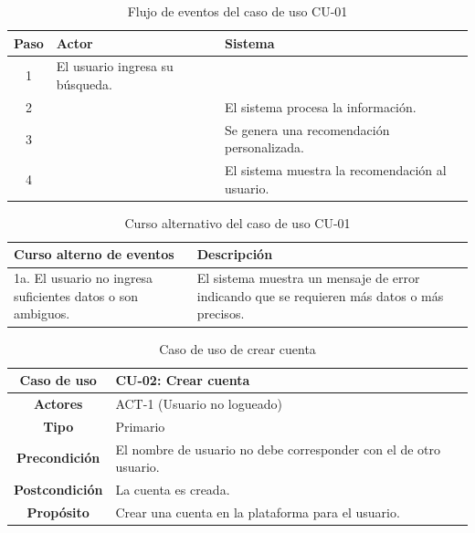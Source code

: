 \begin{table}[H]
\centering
\begin{tabular}{|c|p{5cm}|p{5cm}|}
\hline
\rowcolor{green!40} \textbf{Paso} & \textbf{Actor} & \textbf{Sistema} \\ \hline
\rowcolor{blue!10} 1 & El usuario ingresa su búsqueda. & \\ \hline
\rowcolor{blue!10} 2 & & El sistema procesa la información. \\ \hline
\rowcolor{blue!10} 3 & & Se genera una recomendación personalizada. \\ \hline
\rowcolor{blue!10} 4 & & El sistema muestra la recomendación al usuario. \\ \hline
\end{tabular}
\caption{Flujo de eventos del caso de uso CU-01}
\end{table}

\begin{table}[H]
\centering
\begin{tabular}{|p{4cm}|p{8cm}|}
\hline
\rowcolor{green!40} \textbf{Curso alterno de eventos} & \textbf{Descripción} \\ \hline
\rowcolor{blue!10} 1a. El usuario no ingresa suficientes datos o son ambiguos. & El sistema muestra un mensaje de error indicando que se requieren más datos o más precisos. \\ \hline
\end{tabular}
\caption{Curso alternativo del caso de uso CU-01}
\end{table}

\begin{table}[H]
\centering
\begin{tabular}{|c|p{10cm}|}
\hline
\rowcolor{green!40} \textbf{Caso de uso} & CU-02: Crear cuenta \\ \hline
\rowcolor{blue!10} \textbf{Actores} & ACT-1 (Usuario no logueado) \\ \hline
\rowcolor{blue!10} \textbf{Tipo} & Primario \\ \hline
\rowcolor{blue!10} \textbf{Precondición} & El nombre de usuario no debe corresponder con el de otro usuario. \\ \hline
\rowcolor{blue!10} \textbf{Postcondición} & La cuenta es creada. \\ \hline
\rowcolor{blue!10} \textbf{Propósito} & Crear una cuenta en la plataforma para el usuario. \\ \hline
\end{tabular}
\caption{Caso de uso de crear cuenta}
\end{table}


